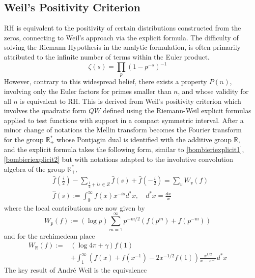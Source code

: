 \documentclass{article}
\def\R{{\mathbb R}}
\begin{document}
\subsection{Weil's Positivity Criterion}\label{sectweilpos}
 RH is equivalent to the positivity of certain distributions constructed from the zeros, connecting to Weil's approach via the explicit formula.
The difficulty of solving the Riemann Hypothesis in the analytic formulation, is often  
primarily attributed to the infinite number of terms within the Euler product.
\begin{equation}\label{eulerproduct1}
 	\zeta(s) = \prod_p (1- p^{-s})^{-1}
 \end{equation} 
However, contrary to this widespread belief,  there exists a property 
$P(n)$, involving only
the Euler factors for primes smaller than $n$, and
 whose validity for all $n$ is equivalent to RH. 
This is derived  from  Weil's positivity criterion which involves the quadratic
 form $QW$ defined using the Riemann-Weil explicit formulas applied to test functions with support in a compact symmetric interval. After a minor change of notations the Mellin transform becomes the Fourier transform for the group $\R_+^*$ whose Pontjagin dual is identified with the additive group $\R$, and the explicit formula takes the following  form, similar to \eqref{bombieriexplicit1}, \eqref{bombieriexplicit2} but with notations adapted to the involutive convolution algebra of the group $\R_+^*$,
 $$\begin{aligned} & \widehat{f}\left(\frac{i}{2}\right)-\sum_{\frac{1}{2}+i s \in Z} \widehat{f}(s)+\widehat{f}\left(-\frac{i}{2}\right)=\sum_v W_v(f) \\ & \widehat{f}(s):=\int_0^{\infty} f(x) x^{-i s} d^* x, \quad d^* x=\frac{d x}{x}\end{aligned}$$
where the local contributions are now given by 
\begin{equation}\label{wp}W_p(f):=(\log p) \sum_{m=1}^{\infty} p^{-m / 2}\left(f\left(p^m\right)+f\left(p^{-m}\right)\right)
 \end{equation}
 and for the archimedean place
\begin{equation}\label{arch}
\begin{aligned} W_{\mathbb{R}}(f):= & (\log 4 \pi+\gamma) f(1) \\ & +\int_1^{\infty}\left(f(x)+f\left(x^{-1}\right)-2 x^{-1 / 2} f(1)\right) \frac{x^{1 / 2}}{x-x^{-1}} d^* x\end{aligned}	
\end{equation}
The key result of André Weil is the equivalence
\end{document}

